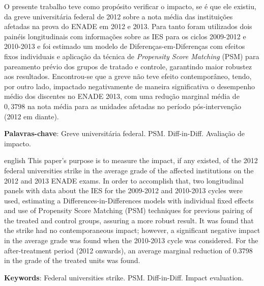 

\newcommand\disciplina{Avaliação de Políticas Públicas}
\newcommand\professor{Aléssio Tony C. Almeida}







\begin{resumo}

O presente trabalho teve como propósito verificar o impacto, se é que ele existiu, da greve universitária federal de 2012 sobre a nota média das instituições afetadas na prova do ENADE em 2012 e 2013. Para tanto foram utilizados dois painéis longitudinais com informações sobre as IES para os ciclos 2009-2012 e 2010-2013 e foi estimado um modelo de Diferenças-em-Diferenças com efeitos fixos individuais e aplicação da técnica de \textit{Propensity Score Matching} (PSM) para pareamento prévio dos grupos de tratado e controle, garantindo maior robustez aos resultados. Encontrou-se que a greve não teve efeito contemporâneo, tendo, por outro lado, impactado negativamente de maneira significativa o desempenho médio dos discentes no ENADE 2013, com uma redução marginal média de $0,3798$ na nota média para as unidades afetadas no período pós-intervenção (2012 em diante).

\textbf{Palavras-chave}: Greve universitária federal. PSM.  Diff-in-Diff. Avaliação de impacto.
\end{resumo} 

\begin{resumo}[Abstract]
\begin{otherlanguage*}{english}
This paper's purpose is to measure the impact, if any existed, of the 2012 federal universities strike in the average grade of the affected institutions on the 2012 and 2013 ENADE exams. In order to accomplish that, two longitudinal panels with data about the IES for the 2009-2012 and 2010-2013 cycles were used, estimating a Differences-in-Differences models with individual fixed effects and use of Propensity Score Matching (PSM) techniques for previous pairing of the treated and control groups, assuring a more robust result. It was found that the strike had no contemporaneous impact; however, a significant negative impact in the average grade was found when the 2010-2013 cycle was considered. For the after-treatment period (2012 onwards), an average marginal reduction of 0.3798 in the grade of the treated units was found.
 \vspace{\onelineskip}
 
   \noindent 
   \textbf{Keywords}: Federal universities strike. PSM. Diff-in-Diff. Impact evaluation.
 \end{otherlanguage*}
\end{resumo} 

